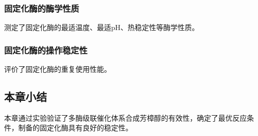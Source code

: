 \subsubsection{固定化酶的酶学性质}


测定了固定化酶的最适温度、最适pH、热稳定性等酶学性质。

\subsubsection{固定化酶的操作稳定性}


评价了固定化酶的重复使用性能。

\subsection{本章小结}


本章通过实验验证了多酶级联催化体系合成芳樟醇的有效性，确定了最优反应条件，制备的固定化酶具有良好的稳定性。
